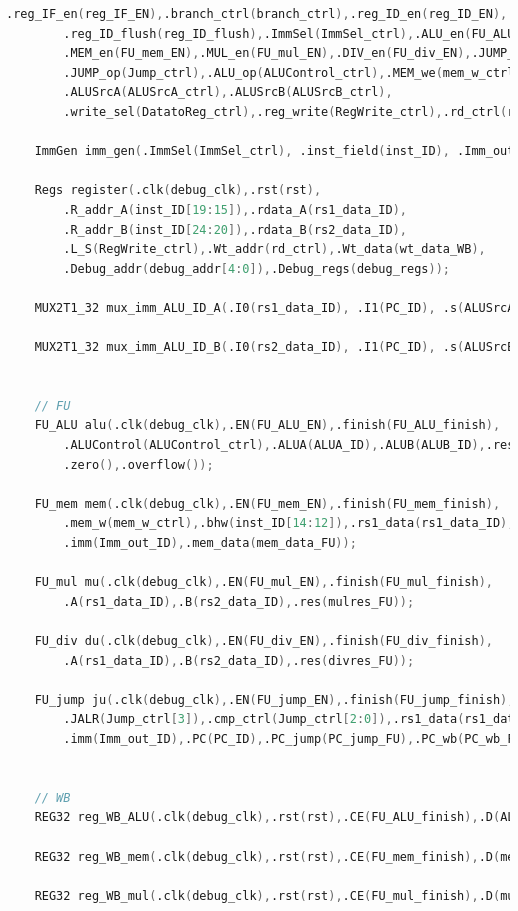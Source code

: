 \begin{lstlisting}[language = {verilog}]
		.reg_IF_en(reg_IF_EN),.branch_ctrl(branch_ctrl),.reg_ID_en(reg_ID_EN),
		.reg_ID_flush(reg_ID_flush),.ImmSel(ImmSel_ctrl),.ALU_en(FU_ALU_EN),
		.MEM_en(FU_mem_EN),.MUL_en(FU_mul_EN),.DIV_en(FU_div_EN),.JUMP_en(FU_jump_EN),
		.JUMP_op(Jump_ctrl),.ALU_op(ALUControl_ctrl),.MEM_we(mem_w_ctrl),
		.ALUSrcA(ALUSrcA_ctrl),.ALUSrcB(ALUSrcB_ctrl),
		.write_sel(DatatoReg_ctrl),.reg_write(RegWrite_ctrl),.rd_ctrl(rd_ctrl));

	ImmGen imm_gen(.ImmSel(ImmSel_ctrl), .inst_field(inst_ID), .Imm_out(Imm_out_ID));            //to fill sth.in

	Regs register(.clk(debug_clk),.rst(rst),
		.R_addr_A(inst_ID[19:15]),.rdata_A(rs1_data_ID),
		.R_addr_B(inst_ID[24:20]),.rdata_B(rs2_data_ID),
		.L_S(RegWrite_ctrl),.Wt_addr(rd_ctrl),.Wt_data(wt_data_WB),
		.Debug_addr(debug_addr[4:0]),.Debug_regs(debug_regs));

	MUX2T1_32 mux_imm_ALU_ID_A(.I0(rs1_data_ID), .I1(PC_ID), .s(ALUSrcA_ctrl), .o(ALUA_ID));            //to fill sth.in

	MUX2T1_32 mux_imm_ALU_ID_B(.I0(rs2_data_ID), .I1(PC_ID), .s(ALUSrcB_ctrl), .o(ALUB_ID));            //to fill sth.in


	// FU
	FU_ALU alu(.clk(debug_clk),.EN(FU_ALU_EN),.finish(FU_ALU_finish),
		.ALUControl(ALUControl_ctrl),.ALUA(ALUA_ID),.ALUB(ALUB_ID),.res(ALUout_FU),
		.zero(),.overflow());

	FU_mem mem(.clk(debug_clk),.EN(FU_mem_EN),.finish(FU_mem_finish),
		.mem_w(mem_w_ctrl),.bhw(inst_ID[14:12]),.rs1_data(rs1_data_ID),.rs2_data(rs2_data_ID),
		.imm(Imm_out_ID),.mem_data(mem_data_FU));

	FU_mul mu(.clk(debug_clk),.EN(FU_mul_EN),.finish(FU_mul_finish),
		.A(rs1_data_ID),.B(rs2_data_ID),.res(mulres_FU));

	FU_div du(.clk(debug_clk),.EN(FU_div_EN),.finish(FU_div_finish),
		.A(rs1_data_ID),.B(rs2_data_ID),.res(divres_FU));

	FU_jump ju(.clk(debug_clk),.EN(FU_jump_EN),.finish(FU_jump_finish),
		.JALR(Jump_ctrl[3]),.cmp_ctrl(Jump_ctrl[2:0]),.rs1_data(rs1_data_ID),.rs2_data(rs2_data_ID),
		.imm(Imm_out_ID),.PC(PC_ID),.PC_jump(PC_jump_FU),.PC_wb(PC_wb_FU),.cmp_res(cmp_res_FU));


	// WB
	REG32 reg_WB_ALU(.clk(debug_clk),.rst(rst),.CE(FU_ALU_finish),.D(ALUout_FU),.Q(ALUout_WB));

	REG32 reg_WB_mem(.clk(debug_clk),.rst(rst),.CE(FU_mem_finish),.D(mem_data_FU),.Q(mem_data_WB));

	REG32 reg_WB_mul(.clk(debug_clk),.rst(rst),.CE(FU_mul_finish),.D(mulres_FU),.Q(mulres_WB));


\end{lstlisting}
